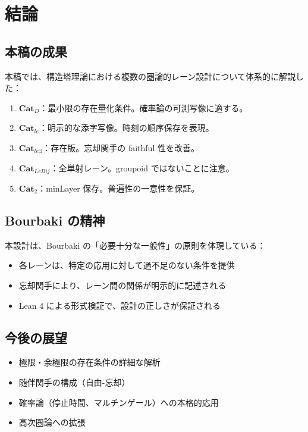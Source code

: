 \documentclass{ltjsarticle}
\theoremstyle{definition}
\newcommand{\catD}{\mathbf{Cat}_D}
\newcommand{\catle}{\mathbf{Cat}_{le}}
\newcommand{\catleexists}{\mathbf{Cat}_{le\exists}}
\newcommand{\catlebij}{\mathbf{Cat}_{LeBij}}
\newcommand{\cattwo}{\mathbf{Cat}_2}
\begin{document}
\section{結論}

\subsection{本稿の成果}

本稿では、構造塔理論における複数の圏論的レーン設計について体系的に解説した：

\begin{enumerate}[label=(\arabic*)]
  \item \textbf{$\catD$}：最小限の存在量化条件。確率論の可測写像に適する。
  
  \item \textbf{$\catle$}：明示的な添字写像。時刻の順序保存を表現。
  
  \item \textbf{$\catleexists$}：存在版。忘却関手の faithful 性を改善。
  
  \item \textbf{$\catlebij$}：全単射レーン。groupoid ではないことに注意。
  
  \item \textbf{$\cattwo$}：minLayer 保存。普遍性の一意性を保証。
\end{enumerate}

\subsection{Bourbaki の精神}

本設計は、Bourbaki の「必要十分な一般性」の原則を体現している：

\begin{itemize}
  \item 各レーンは、特定の応用に対して過不足のない条件を提供
  \item 忘却関手により、レーン間の関係が明示的に記述される
  \item Lean 4 による形式検証で、設計の正しさが保証される
\end{itemize}

\subsection{今後の展望}

\begin{itemize}
  \item 極限・余極限の存在条件の詳細な解析
  \item 随伴関手の構成（自由-忘却）
  \item 確率論（停止時間、マルチンゲール）への本格的応用
  \item 高次圏論への拡張
\end{itemize}
\end{document}
